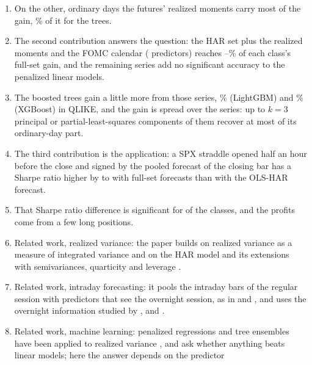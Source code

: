 \begin{enumerate}
  alone delivers the gain.
\item On the other, ordinary days the futures' realized moments carry most of the gain, \rhchOrdRmShareTreeRng\% of it
  for the trees.
\item The second contribution answers the question: the HAR set plus the realized moments and the FOMC calendar
  (\rhbyFLNBase{} predictors) reaches \rhabBaseShareMin--\rhabBaseShareMax\% of each class's full-set gain, and the
  remaining \rhbyFLNSeries{} series add no significant accuracy to the penalized linear models.
\item The boosted trees gain a little more from those series, \rhabLgbmFullVsAddRmFomcAllPct\% (LightGBM) and
  \rhabXgbFullVsAddRmFomcAllPct\% (XGBoost) in QLIKE, and the gain is spread over the series: up to $k = 3$ principal or
  partial-least-squares components of them recover at most \rhbyFXgbBestShortOrdR{} of its ordinary-day part.
\item The third contribution is the application: a \zdte{} SPX straddle opened half an hour before the close and
  signed by the pooled forecast of the closing bar has a Sharpe ratio higher by \rhemFullVsOlsMin{} to
  \rhemFullVsOlsMax{} with full-set forecasts than with the OLS-HAR forecast.
\item That Sharpe ratio difference is significant for \rhemFullVsOlsSigWord{} of the \rhmcsNAltWord{} classes, and the
  profits come from a few long positions.
\item Related work, realized variance: the paper builds on realized variance as a measure of integrated variance
  \citep{AndersenBollerslevDieboldLabys2003,BarndorffNielsenShephard2002} and on the HAR model and its extensions with
  semivariances, quarticity and leverage \citep{Corsi2009,PattonSheppard2015,BollerslevPattonQuaedvlieg2016,CorsiReno2012}.
\item Related work, intraday forecasting: it pools the intraday bars of the regular session with predictors that see
  the overnight session, as in \citet{EngleSokalska2012} and \citet{ZhangZhangCucuringuQian2024}, and uses the
  overnight information studied by \citet{StroudJohannes2014}, \citet{ChenYuZivot2012} and \citet{TodorovaSoucek2014}.
\item Related work, machine learning: penalized regressions and tree ensembles have been applied to realized variance
  \citep{AudrinoKnaus2016,LuongDokuchaev2018,RahimikiaPoon2020,christensen2023machine}, and
  \citet{BrancoRubesamZevallos2024} ask whether anything beats linear models; here the answer depends on the predictor

\end{enumerate}
